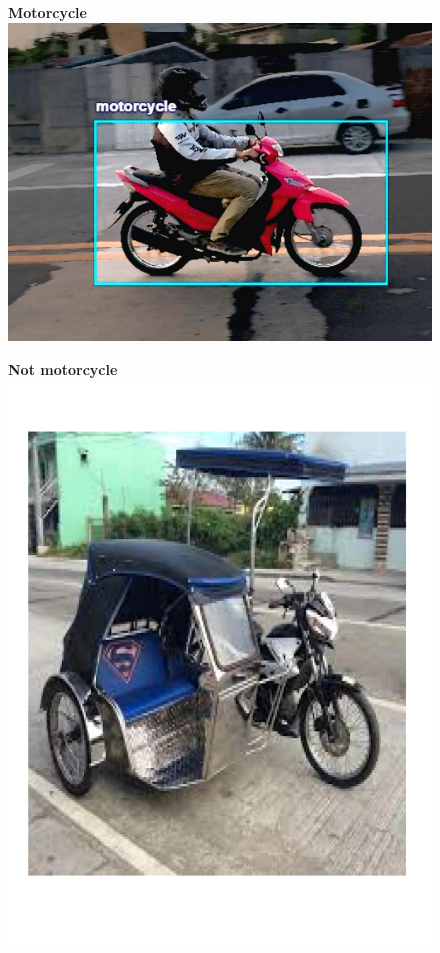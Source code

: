 \begin{refsection}
\begin{figure}[H]
\begin{minipage}{0.3\textwidth}
\centering
\textbf{Motorcycle} \\
\includegraphics[width=\linewidth]{figures/Fig 19a.jpg}
\end{minipage}\hfill
\begin{minipage}{0.3\textwidth}
\centering
\textbf{Not motorcycle} \\
\includegraphics[width=\linewidth]{figures/Fig 19b.jpg}

\end{minipage}
\end{figure}
\end{refsection}
